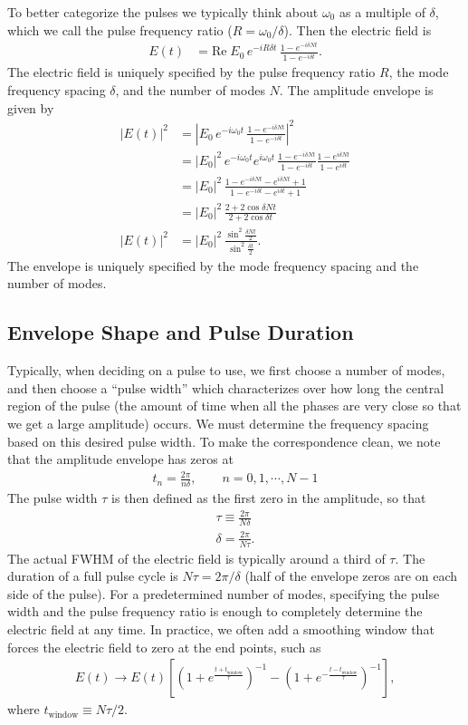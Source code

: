 \documentclass[12pt]{article}
\newcommand{\re}{\mathrm{Re} \;}
\numberwithin{equation}{section}
\begin{document}
To better categorize the pulses we typically think about $\omega_0$ as a multiple of $\delta$, which we call the pulse frequency ratio ($R = \omega_0/\delta$). Then the electric field is
\begin{align*}
E(t) &= \re E_0 \, e^{-i R \delta t} \, \frac{1-e^{-i \delta N t}}{1-e^{-i \delta t}}.
\end{align*}
The electric field is uniquely specified by the pulse frequency ratio $R$, the mode frequency spacing $\delta$, and the number of modes $N$. The amplitude envelope is given by
\begin{align*}
|E(t)|^2 &= |E_0 \, e^{-i \omega_0 t} \, \frac{1-e^{-i \delta N t}}{1-e^{-i \delta t}}|^2 \\
&= |E_0|^2 \, e^{-i \omega_0 t} e^{i \omega_0 t} \, \frac{1-e^{-i \delta N t}}{1-e^{-i \delta t}} \frac{1-e^{i \delta N t}}{1-e^{i \delta t}} \\
&= |E_0|^2 \, \frac{1-e^{-i \delta N t} - e^{i \delta N t} + 1}{1-e^{-i \delta t} - e^{i \delta t} + 1} \\
&= |E_0|^2 \, \frac{2 + 2 \cos{\delta N t}}{2 + 2 \cos{\delta t}} \\
|E(t)|^2 &= |E_0|^2 \, \frac{\sin^2{\frac{\delta N t}{2}}}{\sin^2{\frac{\delta t}{2}}}.
\end{align*}
The envelope is uniquely specified by the mode frequency spacing and the number of modes.

\subsection{Envelope Shape and Pulse Duration}
Typically, when deciding on a pulse to use, we first choose a number of modes, and then choose a ``pulse width'' which characterizes over how long the central region of the pulse (the amount of time when all the phases are very close so that we get a large amplitude) occurs. We must determine the frequency spacing based on this desired pulse width. To make the correspondence clean, we note that the amplitude envelope has zeros at
\begin{align*}
t_n = \frac{2\pi}{n \delta}, \qquad n = 0, 1, \cdots, N-1
\end{align*}
The pulse width $\tau$ is then defined as the first zero in the amplitude, so that
\begin{align*}
\tau \equiv \frac{2\pi}{N\delta} \\
\delta = \frac{2\pi}{N\tau}.
\end{align*}
The actual FWHM of the electric field is typically around a third of $\tau$. The duration of a full pulse cycle is $N\tau = 2\pi/\delta$ (half of the envelope zeros are on each side of the pulse). For a predetermined number of modes, specifying the pulse width and the pulse frequency ratio is enough to completely determine the electric field at any time. In practice, we often add a smoothing window that forces the electric field to zero at the end points, such as
\begin{align*}
E(t) \rightarrow E(t) \left[\left(1 + e^{\frac{t+t_\mathrm{window}}{\tau}}\right)^{-1} - \left(1 + e^{-\frac{t-t_\mathrm{window}}{\tau}}\right)^{-1}\right],
\end{align*}
where $t_\mathrm{window} \equiv N \tau/2$.
\end{document}
